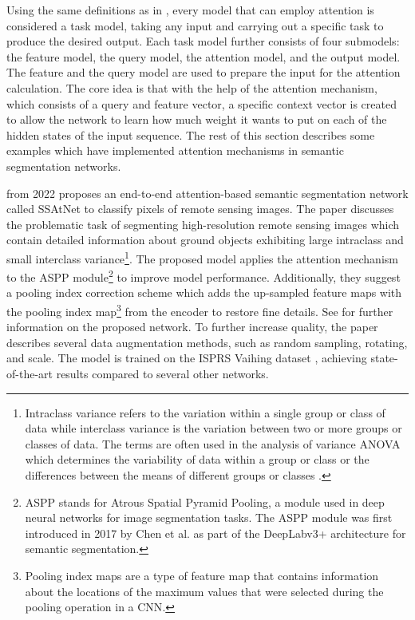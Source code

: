 Using the same definitions as in \cite{NIU202148}, every model that can employ attention is considered a task model, taking any input and carrying out a specific task to produce the desired output. Each task model further consists of four submodels: the feature model, the query model, the attention model, and the output model. The feature and the query model are used to prepare the input for the attention calculation. The core idea is that with the help of the attention mechanism, which consists of a query and feature vector, a specific context vector is created to allow the network to learn how much weight it wants to put on each of the hidden states of the input sequence. The rest of this section describes some examples which have implemented attention mechanisms in semantic segmentation networks.

 \cite{9513251} from 2022  proposes an end-to-end attention-based semantic segmentation network called SSAtNet to classify pixels of remote sensing images. The paper discusses the problematic task of segmenting high-resolution remote sensing images which contain detailed information about ground objects exhibiting large intraclass and small interclass variance\footnote{Intraclass variance refers to the variation within a single group or class of data while interclass variance is the variation between two or more groups or classes of data. The terms are often used in the analysis of variance ANOVA which determines the variability of data within a group or class or the differences between the means of different groups or classes \cite{st1989analysis}.}. The proposed model applies the attention mechanism to the ASPP module\footnote{ASPP stands for Atrous Spatial Pyramid Pooling, a module used in deep neural networks for image segmentation tasks. The ASPP module was first introduced in 2017 by Chen et al. as part of the DeepLabv3+ architecture for semantic segmentation.\cite{chen2017deeplab}} to improve model performance.
Additionally, they suggest a pooling index correction scheme which adds the up-sampled feature maps with the pooling index map\footnote{Pooling index maps are a type of feature map that contains information about the locations of the maximum values that were selected during the pooling operation in a \ac{CNN}.} from the encoder to restore fine details. See  for further information on the proposed network. To further increase quality, the paper describes several data augmentation methods, such as random sampling, rotating, and scale. The model is trained on the ISPRS Vaihing dataset \cite{vaihingenISPRS}, achieving state-of-the-art results compared to several other networks.
